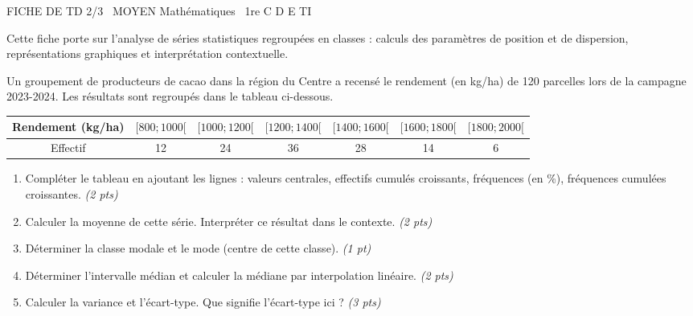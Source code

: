 \documentclass[11pt]{article}
\begin{document}
\begin{tcolorbox}[enhanced,colback=popink,colframe=popink,arc=10pt,boxrule=0pt,left=12pt,right=12pt,top=9pt,bottom=9pt]
{\color{white}\popxbold\small FICHE DE TD 2/3 \textbullet\ MOYEN \hfill Mathématiques \textbullet\ 1re C D E TI\par}
\end{tcolorbox}
\vspace{4pt}
Cette fiche porte sur l'analyse de séries statistiques regroupées en classes : calculs des paramètres de position et de dispersion, représentations graphiques et interprétation contextuelle.

\begin{exercice}
Un groupement de producteurs de cacao dans la région du Centre a recensé le rendement (en kg/ha) de 120 parcelles lors de la campagne 2023-2024. Les résultats sont regroupés dans le tableau ci-dessous.
\begin{center}
\begin{tabular}{|c|c|c|c|c|c|c|}
\hline
Rendement (kg/ha) & $[800; 1000[$ & $[1000; 1200[$ & $[1200; 1400[$ & $[1400; 1600[$ & $[1600; 1800[$ & $[1800; 2000[$ \\
\hline
Effectif & 12 & 24 & 36 & 28 & 14 & 6 \\
\hline
\end{tabular}
\end{center}
\begin{enumerate}
    \item Compléter le tableau en ajoutant les lignes : valeurs centrales, effectifs cumulés croissants, fréquences (en \%), fréquences cumulées croissantes. \textit{(2 pts)}
    \item Calculer la moyenne de cette série. Interpréter ce résultat dans le contexte. \textit{(2 pts)}
    \item Déterminer la classe modale et le mode (centre de cette classe). \textit{(1 pt)}
    \item Déterminer l'intervalle médian et calculer la médiane par interpolation linéaire. \textit{(2 pts)}
    \item Calculer la variance et l'écart-type. Que signifie l'écart-type ici ? \textit{(3 pts)}
\end{enumerate}
\end{exercice}
\end{document}
